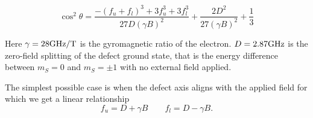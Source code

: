 \begin{equation}
    \cos^2 \theta = \frac{-(f_u + f_l)^3 + 3 f_u^3 + 3 f_l^3}{27 D (\gamma B)^2} + \frac{2D^2}{27(\gamma B )^2} + \frac{1}{3}
\end{equation}

Here $\gamma = 28 \ce{GHz/T}$ is the gyromagnetic ratio of the electron. $D = 2.87 \ce{GHz}$ is the zero-field splitting of the defect ground state, that is the energy difference between $m_S = 0$ and $m_S = \pm 1$ with no external field applied. 

The simplest possible case is when the defect axis aligns with the applied field for which we get a linear relationship 
\begin{equation}
    f_u = D + \gamma B \qquad f_l = D - \gamma B.
\end{equation}





